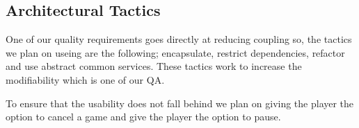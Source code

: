 \subsection{Architectural Tactics}

One of our quality requirements goes directly at reducing coupling so, the tactics we plan on useing are the following; encapsulate, restrict dependencies, refactor and use abstract common services. These tactics work to increase the modifiability which is one of our QA.

To ensure that the usability does not fall behind we plan on giving the player the option to cancel a game and give the player the option to pause.
